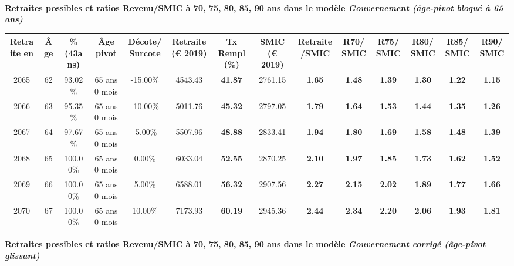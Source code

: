  ~\\{\bf \noindent Retraites possibles et ratios Revenu/SMIC à 70, 75, 80, 85, 90 ans dans le modèle \emph{Gouvernement (âge-pivot bloqué à 65 ans)}}  
 
\begin{adjustbox}{max width=\textwidth} 
\begin{tabular}[htb]{|c|c||c|c|c||c|c||c|c||c|c|c|c|c|} 
\hline 
 Retraite en &  Âge &  \%(43ans) &  Âge pivot &  Décote/Surcote &  Retraite (\euro{} 2019) &  Tx Rempl(\%) &  SMIC (\euro{} 2019) &  Retraite/SMIC &  R70/SMIC &  R75/SMIC &  R80/SMIC &  R85/SMIC &  R90/SMIC \\ 
\hline \hline 
 2065 &  62 &  93.02\% &  65 ans 0 mois &  -15.00\% &  4543.43 &  {\bf 41.87} &  2761.15 &  {\bf 1.65} &  {\bf 1.48} &  {\bf 1.39} &  {\bf 1.30} &  {\bf 1.22} &  {\bf 1.15} \\ 
\hline 
 2066 &  63 &  95.35\% &  65 ans 0 mois &  -10.00\% &  5011.76 &  {\bf 45.32} &  2797.05 &  {\bf 1.79} &  {\bf 1.64} &  {\bf 1.53} &  {\bf 1.44} &  {\bf 1.35} &  {\bf 1.26} \\ 
\hline 
 2067 &  64 &  97.67\% &  65 ans 0 mois &  -5.00\% &  5507.96 &  {\bf 48.88} &  2833.41 &  {\bf 1.94} &  {\bf 1.80} &  {\bf 1.69} &  {\bf 1.58} &  {\bf 1.48} &  {\bf 1.39} \\ 
\hline 
 2068 &  65 &  100.00\% &  65 ans 0 mois &  0.00\% &  6033.04 &  {\bf 52.55} &  2870.25 &  {\bf 2.10} &  {\bf 1.97} &  {\bf 1.85} &  {\bf 1.73} &  {\bf 1.62} &  {\bf 1.52} \\ 
\hline 
 2069 &  66 &  100.00\% &  65 ans 0 mois &  5.00\% &  6588.01 &  {\bf 56.32} &  2907.56 &  {\bf 2.27} &  {\bf 2.15} &  {\bf 2.02} &  {\bf 1.89} &  {\bf 1.77} &  {\bf 1.66} \\ 
\hline 
 2070 &  67 &  100.00\% &  65 ans 0 mois &  10.00\% &  7173.93 &  {\bf 60.19} &  2945.36 &  {\bf 2.44} &  {\bf 2.34} &  {\bf 2.20} &  {\bf 2.06} &  {\bf 1.93} &  {\bf 1.81} \\ 
\hline 
\hline 
\end{tabular} 
\end{adjustbox} 
 
 \vspace{0.1cm} 
{\bf \noindent Retraites possibles et ratios Revenu/SMIC à 70, 75, 80, 85, 90 ans dans le modèle \emph{Gouvernement corrigé (âge-pivot glissant)}}  
 
